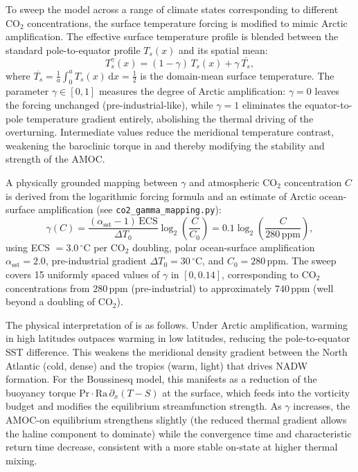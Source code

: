 \documentclass[12pt, a4paper]{article}
\renewcommand{\Pr}{\mathrm{Pr}}
\newcommand{\Ra}{\mathrm{Ra}}
\newcommand{\CO}{CO\ensuremath{_2}}
\begin{document}
To sweep the model across a range of climate states corresponding to different
\CO{} concentrations, the surface temperature forcing is modified to mimic
Arctic amplification. The effective surface temperature profile is blended
between the standard pole-to-equator profile $T_s(x)$ and its spatial mean:
\begin{equation}
  T_s^\gamma(x) = (1-\gamma)\,T_s(x) + \gamma\,\overline{T_s},
  \label{eq:Tgamma}
\end{equation}
where $\overline{T_s} = \frac{1}{a}\int_0^a T_s(x)\,\mathrm{d}x = \tfrac{1}{2}$
is the domain-mean surface temperature. The parameter $\gamma \in [0,1]$
measures the degree of Arctic amplification: $\gamma = 0$ leaves the forcing
unchanged (pre-industrial-like), while $\gamma = 1$ eliminates the
equator-to-pole temperature gradient entirely, abolishing the thermal driving
of the overturning. Intermediate values reduce the meridional temperature
contrast, weakening the baroclinic torque in  and thereby
modifying the stability and strength of the AMOC.

A physically grounded mapping between $\gamma$ and atmospheric \CO{}
concentration $C$ is derived from the logarithmic forcing formula and an
estimate of Arctic ocean-surface amplification (see \texttt{co2\_gamma\_mapping.py}):
\begin{equation}
  \gamma(C) = \frac{(\alpha_\mathrm{sst}-1)\,\mathrm{ECS}}{\Delta T_0}
              \log_2\!\left(\frac{C}{C_0}\right)
  = 0.1\log_2\!\left(\frac{C}{280\,\text{ppm}}\right),
  \label{eq:co2gamma}
\end{equation}
using ECS $= 3.0\,^{\circ}\text{C}$ per \CO{} doubling, polar ocean-surface
amplification $\alpha_\mathrm{sst} = 2.0$, pre-industrial gradient
$\Delta T_0 = 30\,^{\circ}\text{C}$, and $C_0 = 280\,\text{ppm}$. The sweep
covers 15 uniformly spaced values of $\gamma$ in $[0, 0.14]$, corresponding
to \CO{} concentrations from $280\,\text{ppm}$ (pre-industrial) to approximately
$740\,\text{ppm}$ (well beyond a doubling of \CO{}).

The physical interpretation of  is as follows. Under Arctic
amplification, warming in high latitudes outpaces warming in low latitudes,
reducing the pole-to-equator SST difference. This weakens the meridional
density gradient between the North Atlantic (cold, dense) and the tropics
(warm, light) that drives NADW formation. For the Boussinesq model, this
manifests as a reduction of the buoyancy torque $\Pr\cdot\Ra\,\partial_x(T-S)$
at the surface, which feeds into the vorticity budget and modifies the
equilibrium streamfunction strength. As $\gamma$ increases, the AMOC-on
equilibrium strengthens slightly (the reduced thermal gradient allows the
haline component to dominate) while the convergence time and characteristic
return time decrease, consistent with a more stable on-state at higher thermal
mixing.
\end{document}
